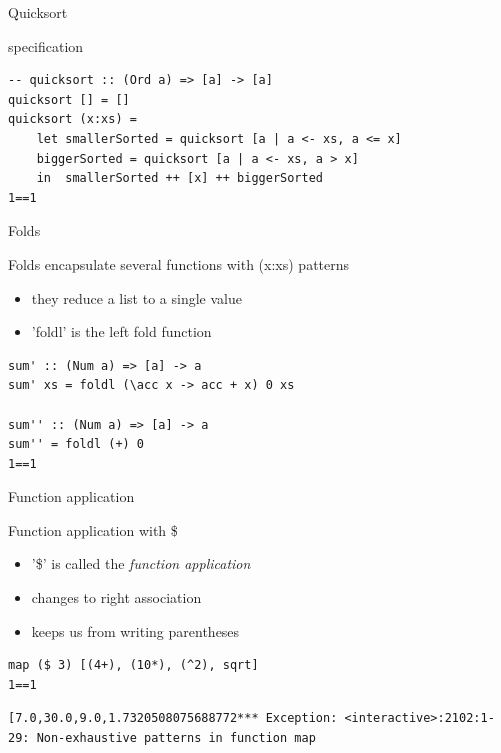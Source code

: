 \documentclass[presetation]{beamer}
\begin{document}
\begin{frame}[fragile,label={sec:orga8ac5a2}]{Quicksort}
 \begin{block}{specification}
\begin{verbatim}
-- quicksort :: (Ord a) => [a] -> [a]  
quicksort [] = []  
quicksort (x:xs) =   
    let smallerSorted = quicksort [a | a <- xs, a <= x]  
	biggerSorted = quicksort [a | a <- xs, a > x]  
    in  smallerSorted ++ [x] ++ biggerSorted  
1==1
\end{verbatim}
\end{block}
\end{frame}
\begin{frame}[fragile,label={sec:orge244227}]{Folds}
 \begin{block}{Folds encapsulate several functions with (x:xs) patterns}
\begin{itemize}
\item they reduce a list to a single value
\item 'foldl' is the left fold function
\end{itemize}
\begin{verbatim}
sum' :: (Num a) => [a] -> a
sum' xs = foldl (\acc x -> acc + x) 0 xs

sum'' :: (Num a) => [a] -> a
sum'' = foldl (+) 0
1==1
\end{verbatim}
\end{block}
\end{frame}

\begin{frame}[fragile,label={sec:orgc71d945}]{Function application}
 \begin{block}{Function application with \$}
\begin{itemize}
\item '\$' is called the \emph{function application}
\item changes to right association
\item keeps us from writing parentheses
\end{itemize}

\begin{verbatim}
map ($ 3) [(4+), (10*), (^2), sqrt]
1==1
\end{verbatim}

\begin{verbatim}
[7.0,30.0,9.0,1.7320508075688772*** Exception: <interactive>:2102:1-29: Non-exhaustive patterns in function map
\end{verbatim}
\end{block}
\end{frame}
\end{document}
